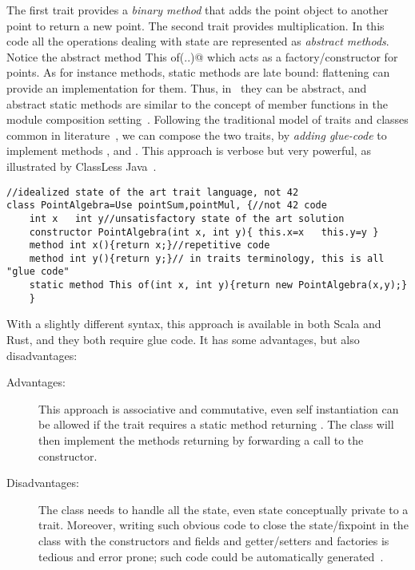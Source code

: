 The first trait provides a \emph{binary method} that 
adds the point object to another point to return a new point. 
The second trait provides multiplication.
\noindent In this code all the operations dealing with state are represented as \emph{abstract methods}.
Notice the abstract \Q@static method This of(..)@ which acts as a factory/constructor
for points. 
As for instance methods, static methods are late bound:  flattening can provide an implementation for them.
Thus, in \name\ they can be abstract, and abstract static methods are similar to the concept of member functions in the module composition setting~\cite{ancona_zucca_2002}.
Following the traditional model of traits and classes common in literature~\cite{ducasse2006traits},
we can compose the two traits, by \emph{adding glue-code}
to implement methods \Q@x@, \Q@y@ and \Q@of@.
This approach is verbose but very
powerful, as illustrated by ClassLess Java~\cite{wang2016classless}.

\begin{lstlisting}
//idealized state of the art trait language, not 42
class PointAlgebra=Use pointSum,pointMul, {//not 42 code
    int x   int y//unsatisfactory state of the art solution
    constructor PointAlgebra(int x, int y){ this.x=x   this.y=y }
    method int x(){return x;}//repetitive code
    method int y(){return y;}// in traits terminology, this is all "glue code"
    static method This of(int x, int y){return new PointAlgebra(x,y);}
    }
\end{lstlisting}


\noindent 

With a slightly different syntax, this approach is available in both Scala and Rust, and they both require glue code.
It has some advantages, but also disadvantages: 

\begin{description}

\item[Advantages:] This approach is associative and commutative, even self instantiation
  can be allowed if the trait requires a static method
  returning \Q@This@. The class will then implement the methods returning \Q@This@
  by forwarding a call to the constructor.
  
\item[Disadvantages:]
The class needs to handle all the state, even state conceptually
   private to a trait. 
 Moreover, writing such obvious code to close
  the state/fixpoint in the class 
   with the constructors and fields and getter/setters and factories is tedious and error prone; such code could be automatically
   generated~\cite{wang2016classless}.
\end{description}


